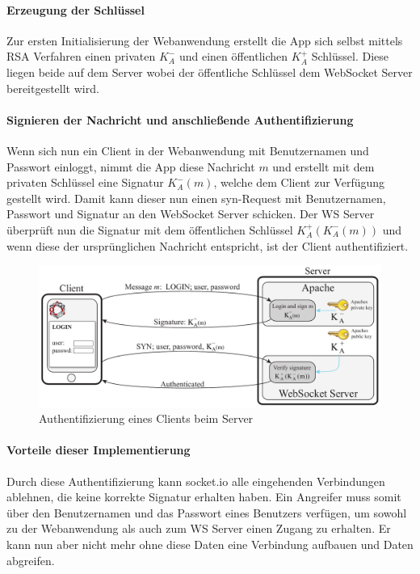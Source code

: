 \paragraph{Erzeugung der Schlüssel}
Zur ersten Initialisierung der Webanwendung erstellt die App sich selbst mittels RSA Verfahren einen privaten $K^-_A$ und einen öffentlichen $K^+_A$ Schlüssel. Diese liegen beide auf dem Server wobei der öffentliche Schlüssel dem WebSocket Server bereitgestellt wird.

\paragraph{Signieren der Nachricht und anschließende Authentifizierung}
Wenn sich nun ein Client in der Webanwendung mit Benutzernamen und Passwort einloggt, nimmt die App diese Nachricht $m$ und erstellt mit dem privaten Schlüssel eine Signatur $K^-_A(m)$, welche dem Client zur Verfügung gestellt wird. Damit kann dieser nun einen syn-Request mit Benutzernamen, Passwort und Signatur an den WebSocket Server schicken. Der WS Server überprüft nun die Signatur mit dem öffentlichen Schlüssel $K^+_A(K^-_A(m))$ und wenn diese der ursprünglichen Nachricht entspricht, ist der Client authentifiziert.

\begin{figure}[!ht]
	\centering
	\includegraphics[width=15cm]{fig/publicprivate}
	\caption{Authentifizierung eines Clients beim Server}
\end{figure}

\paragraph{Vorteile dieser Implementierung}
Durch diese Authentifizierung kann socket.io alle eingehenden Verbindungen ablehnen, die keine korrekte Signatur erhalten haben. Ein Angreifer muss somit über den Benutzernamen und das Passwort eines Benutzers verfügen, um sowohl zu der Webanwendung als auch zum WS Server einen Zugang zu erhalten. Er kann nun aber nicht mehr ohne diese Daten eine Verbindung aufbauen und Daten abgreifen.\par

